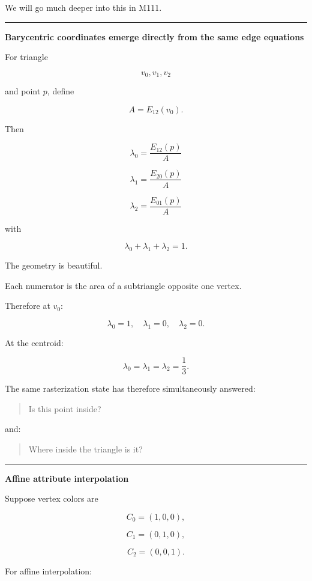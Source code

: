 We will go much deeper into this in M111.

\begin{center}\rule{0.5\linewidth}{0.5pt}\end{center}

\textbf{Barycentric coordinates emerge directly from the same edge equations}

For triangle

\[
v_0,v_1,v_2
\]

and point \(p\), define

\[
A=E_{12}(v_0).
\]

Then

\[
\boxed{
\lambda_0=
\frac{E_{12}(p)}{A}
}
\]

\[
\boxed{
\lambda_1=
\frac{E_{20}(p)}{A}
}
\]

\[
\boxed{
\lambda_2=
\frac{E_{01}(p)}{A}
}
\]

with

\[
\lambda_0+\lambda_1+\lambda_2=1.
\]

The geometry is beautiful.

Each numerator is the area of a subtriangle opposite one vertex.

Therefore at \(v_0\):

\[
\lambda_0=1,\quad
\lambda_1=0,\quad
\lambda_2=0.
\]

At the centroid:

\[
\lambda_0=
\lambda_1=
\lambda_2=
\frac13.
\]

The same rasterization state has therefore simultaneously answered:

\begin{quote}
Is this point inside?
\end{quote}

and:

\begin{quote}
Where inside the triangle is it?
\end{quote}

\begin{center}\rule{0.5\linewidth}{0.5pt}\end{center}

\textbf{Affine attribute interpolation}

Suppose vertex colors are

\[
C_0=(1,0,0),
\]

\[
C_1=(0,1,0),
\]

\[
C_2=(0,0,1).
\]

For affine interpolation:

